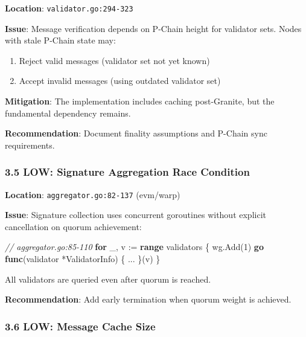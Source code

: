 \documentclass[
]{article}
\newenvironment{Shaded}{}{}
\newcommand{\CommentTok}[1]{\textcolor[rgb]{0.38,0.63,0.69}{\textit{#1}}}
\newcommand{\ControlFlowTok}[1]{\textcolor[rgb]{0.00,0.44,0.13}{\textbf{#1}}}
\newcommand{\DecValTok}[1]{\textcolor[rgb]{0.25,0.63,0.44}{#1}}
\newcommand{\KeywordTok}[1]{\textcolor[rgb]{0.00,0.44,0.13}{\textbf{#1}}}
\newcommand{\NormalTok}[1]{#1}
\newcommand{\OperatorTok}[1]{\textcolor[rgb]{0.40,0.40,0.40}{#1}}
\providecommand{\tightlist}{%
  \setlength{\itemsep}{0pt}\setlength{\parskip}{0pt}}
\begin{document}
\textbf{Location}: \texttt{validator.go:294-323}

\textbf{Issue}: Message verification depends on P-Chain height for
validator sets. Nodes with stale P-Chain state may:

\begin{enumerate}
\def\labelenumi{\arabic{enumi}.}
\tightlist
\item
  Reject valid messages (validator set not yet known)
\item
  Accept invalid messages (using outdated validator set)
\end{enumerate}

\textbf{Mitigation}: The implementation includes caching post-Granite,
but the fundamental dependency remains.

\textbf{Recommendation}: Document finality assumptions and P-Chain sync
requirements.

\subsubsection{3.5 LOW: Signature Aggregation Race
Condition}\label{35-low-signature-aggregation-race-condition}

\textbf{Location}: \texttt{aggregator.go:82-137} (evm/warp)

\textbf{Issue}: Signature collection uses concurrent goroutines without
explicit cancellation on quorum achievement:

\begin{Shaded}
\begin{Highlighting}[]
\CommentTok{// aggregator.go:85{-}110}
\ControlFlowTok{for}\NormalTok{ \_}\OperatorTok{,}\NormalTok{ v }\OperatorTok{:=} \KeywordTok{range}\NormalTok{ validators }\OperatorTok{\{}
\NormalTok{    wg}\OperatorTok{.}\NormalTok{Add}\OperatorTok{(}\DecValTok{1}\OperatorTok{)}
    \ControlFlowTok{go} \KeywordTok{func}\OperatorTok{(}\NormalTok{validator }\OperatorTok{*}\NormalTok{ValidatorInfo}\OperatorTok{)} \OperatorTok{\{} \OperatorTok{...} \OperatorTok{\}(}\NormalTok{v}\OperatorTok{)}
\OperatorTok{\}}
\end{Highlighting}
\end{Shaded}

All validators are queried even after quorum is reached.

\textbf{Recommendation}: Add early termination when quorum weight is
achieved.

\subsubsection{3.6 LOW: Message Cache
Size}\label{36-low-message-cache-size}
\end{document}
